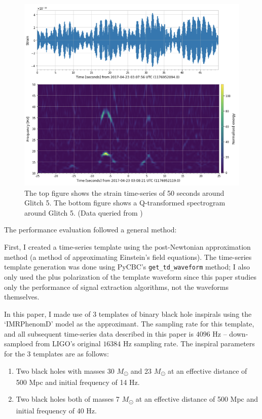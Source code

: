 \documentclass[preprint,
letterpaper,
 amsmath,amssymb,
 aps,
]{revtex4-2}
\def\code#1{\texttt{#1}}
\begin{document}
\begin{figure}[t]
\caption{The top figure shows the strain time-series of 50 seconds around Glitch 5. The bottom figure shows a Q-transformed spectrogram around Glitch 5. (Data queried from \cite{collaboration2019open})}
\includegraphics[scale = .65]{whistle graphics.png}
\centering
\end{figure} 

The performance evaluation followed a general method: 

First, I created a time-series template using the post-Newtonian approximation method (a method of approximating Einstein's field equations). The time-series template generation was done using PyCBC's \code{get\_td\_waveform} method; I also only used the plus polarization of the template waveform since this paper studies only the performance of signal extraction algorithms, not the waveforms themselves. 

In this paper, I made use of 3 templates of binary black hole inspirals using the `IMRPhenomD' model as the approximant. The sampling rate for this template, and all subsequent time-series data described in this paper is $4096$ Hz – down-samploed from LIGO's original $16384$ Hz sampling rate. The inspiral parameters for the 3 templates are as follows:
\begin{enumerate}
    \item Two black holes with masses 30 $M$\textsubscript{\(\odot\)} and 23 $M$\textsubscript{\(\odot\)} at an effective distance of 500 Mpc and initial frequency of 14 Hz.
    \item Two black holes both of masses 7 $M$\textsubscript{\(\odot\)}  at an effective distance of 500 Mpc and initial frequency of 40 Hz.
\end{enumerate}
\end{document}
